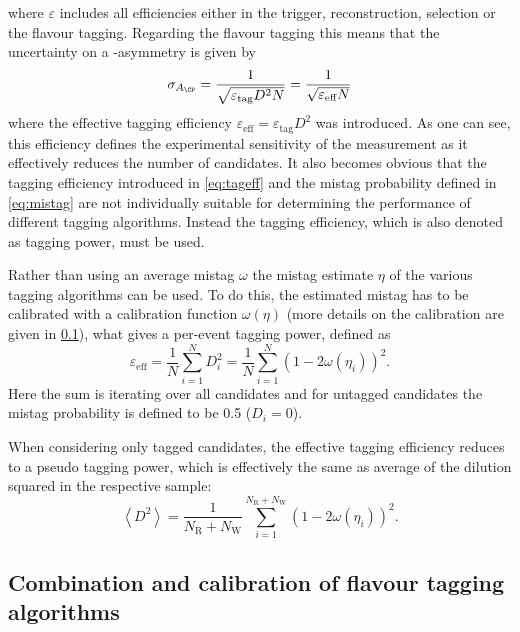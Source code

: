 where $\varepsilon$ includes all efficiencies either in the trigger, reconstruction, selection or the flavour tagging.
Regarding the flavour tagging this means that the uncertainty on a \CP-asymmetry is given by
\begin{equation}
\sigma_{A_{\CP}}=\frac{1}{\sqrt{\varepsilon_{\text{tag}}D^2N}}=\frac{1}{\sqrt{\varepsilon_{\text{eff}}N}}
\end{equation}
where the effective tagging efficiency $\varepsilon_{\text{eff}}=\varepsilon_{\text{tag}}D^2$ was introduced.
As one can see, this efficiency defines the experimental sensitivity of the measurement as it effectively reduces the number of candidates.
It also becomes obvious that the tagging efficiency introduced in \cref{eq:tageff} and the mistag probability defined in \cref{eq:mistag} are not individually suitable for determining the performance of different tagging algorithms.
Instead the tagging efficiency, which is also denoted as tagging power, must be used.

Rather than using an average mistag $\omega$ the mistag estimate $\eta$ of the various tagging algorithms can be used.
To do this, the estimated mistag has to be calibrated with a calibration function $\omega(\eta)$ (more details on the calibration are given in \cref{sec:CombAndCalib}), what gives a per-event tagging power, defined as
\begin{equation}
\varepsilon_{\text{eff}}=\frac{1}{N}\sum_{i=1}^{N}D_i^2=\frac{1}{N}\sum_{i=1}^{N}\left(1-2\omega(\eta_i)\right)^2.
\end{equation}
Here the sum is iterating over all candidates and for untagged candidates the mistag probability is defined to be \num{0.5} ($D_i=0$).

When considering only tagged candidates, the effective tagging efficiency reduces to a pseudo tagging power, which is effectively the same as average of the dilution squared in the respective sample:
\begin{equation}
\left<D^2\right>=\frac{1}{N_{\text{R}}+N_{\text{W}}}\sum_{i=1}^{N_{\text{R}}+N_{\text{W}}}\left(1-2\omega(\eta_i)\right)^2.
\end{equation}

\subsection{Combination and calibration of flavour tagging algorithms}
\label{sec:CombAndCalib}


